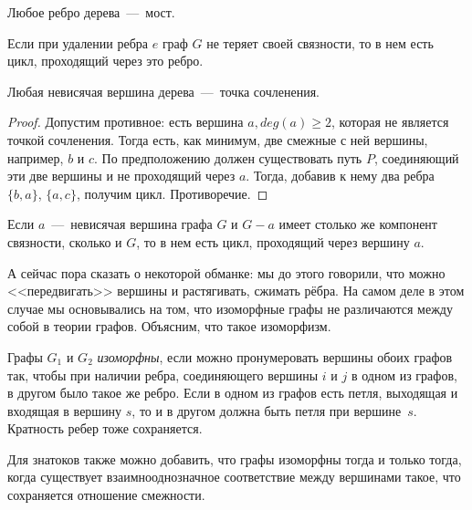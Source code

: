 \begin{consequence}
	Любое ребро дерева~---~мост.
\end{consequence}

\begin{consequence}
	Если при удалении ребра $e$ граф $G$ не теряет своей связности, то в нем есть цикл, проходящий через это ребро.
\end{consequence}

\begin{statement}
	Любая невисячая вершина дерева~---~точка сочленения.
\begin{proof}
	Допустим противное: есть вершина $a, deg(a) \geqslant 2$, которая не является точкой сочленения. Тогда есть, как минимум, 
	две смежные с ней вершины, например, $b$ и $c$. По предположению должен существовать путь $P$, соединяющий эти две вершины и 
	не проходящий через $a$. Тогда, добавив к нему два ребра $\lbrace b, a\rbrace$, $\lbrace a, c\rbrace$, получим цикл. Противоречие.
\end{proof}
\end{statement}

\begin{consequence}
	Если $a$~---~невисячая вершина графа $G$ и $G - a$ имеет столько же компонент связности, сколько и $G$, то в нем есть цикл, 
	проходящий через вершину $a$. 
\end{consequence}


	А сейчас пора сказать о некоторой обманке: мы до этого говорили, что можно <<передвигать>> 
	вершины и растягивать, сжимать рёбра. На самом деле в этом случае мы основывались на том, 
	что изоморфные графы не различаются между собой в теории графов. Объясним, что такое изоморфизм.

\begin{definition}
	Графы $G_1$ и $G_2$ \emph{изоморфны}, если можно пронумеровать вершины обоих графов так, чтобы при наличии ребра, 
	соединяющего вершины $i$ и $j$ в одном из графов, в другом было такое же ребро. Если в одном из графов есть петля, 
	выходящая и входящая в вершину $s$, то и в другом должна быть петля при вершине~$s$. Кратность ребер тоже сохраняется.
\end{definition}

	Для знатоков также можно добавить, что графы изоморфны тогда и только тогда, когда существует взаимнооднозначное соответствие 
	между вершинами такое, что сохраняется отношение смежности.

